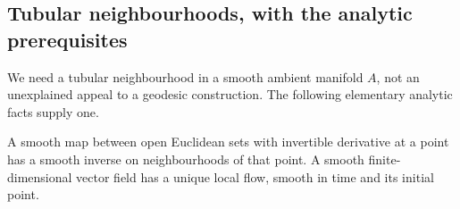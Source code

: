 \subsection{Tubular neighbourhoods, with the analytic prerequisites}
\label{courseIII:manifold-duality-the-diagonal-and-wu-classes.source:section-3}

We need a tubular neighbourhood in a smooth ambient manifold \(A\), not an unexplained appeal to a geodesic construction. The following elementary analytic facts supply one.

\label{courseIII:duality:3.1}

\begin{lemma}
A smooth map between open Euclidean sets with invertible derivative at a point has a smooth inverse on neighbourhoods of that point. A smooth finite-dimensional vector field has a unique local flow, smooth in time and its initial point.
\end{lemma}
